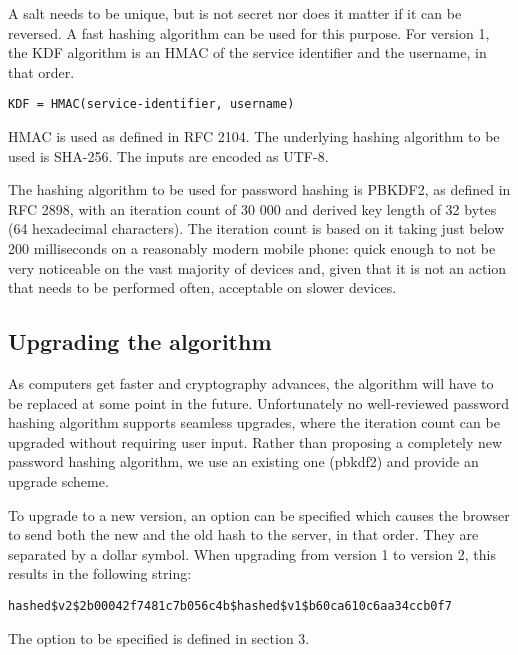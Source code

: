 \documentclass{paper}
\newcommand{\code}[1]{\texttt{\colorbox{gray!11}{#1}}}
\begin{document}
A salt needs to be unique, but is not secret nor does it matter if it can be reversed. A fast
hashing algorithm can be used for this purpose. For version 1, the KDF algorithm is an HMAC
of the service identifier and the username, in that order.

\code{KDF = HMAC(service-identifier, username)}

HMAC is used as defined in RFC 2104\footnotemark. The underlying hashing algorithm to be used is SHA-256.
The inputs are encoded as UTF-8.


The hashing algorithm to be used for password hashing is PBKDF2, as defined in RFC
2898\footnotemark, with an iteration count of 30 000 and derived key length of 32 bytes (64
hexadecimal characters). The iteration count is based on it taking just below 200
milliseconds on a reasonably modern mobile phone: quick enough to not be very noticeable on
the vast majority of devices and, given that it is not an action that needs to be performed
often, acceptable on slower devices.


\subsection{Upgrading the algorithm}

As computers get faster and cryptography advances, the algorithm will have to be replaced
at some point in the future. Unfortunately no well-reviewed password hashing algorithm
supports seamless upgrades, where the iteration count can be upgraded without requiring user
input. Rather than proposing a completely new password hashing algorithm, we use an existing
one (pbkdf2) and provide an upgrade scheme.

To upgrade to a new version, an option can be specified which causes the browser to send both
the new and the old hash to the server, in that order. They are separated by a dollar symbol.
When upgrading from version 1 to version 2, this results in the following string:

\code{hashed\$v2\$2b00042f7481c7b056c4b\$hashed\$v1\$b60ca610c6aa34ccb0f7}

The option to be specified is defined in section 3.
\end{document}
